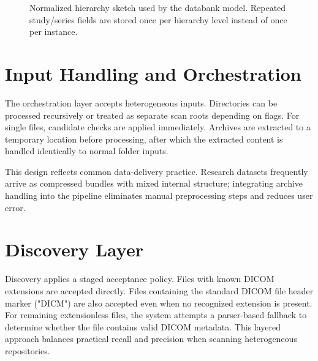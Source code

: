 \begin{figure}[htbp]
\centering
{}
\caption{Normalized hierarchy sketch used by the databank model. Repeated study/series fields are stored once per hierarchy level instead of once per instance.}
\label{fig:normalized-schema-sketch}
\end{figure}

\section{Input Handling and Orchestration}
The orchestration layer accepts heterogeneous inputs. Directories can be processed recursively or treated as separate scan roots depending on flags. For single files, candidate checks are applied immediately. Archives are extracted to a temporary location before processing, after which the extracted content is handled identically to normal folder inputs.

This design reflects common data-delivery practice. Research datasets frequently arrive as compressed bundles with mixed internal structure; integrating archive handling into the pipeline eliminates manual preprocessing steps and reduces user error.

\section{Discovery Layer}
Discovery applies a staged acceptance policy. Files with known DICOM extensions are accepted directly. Files containing the standard DICOM file header marker ("DICM") are also accepted even when no recognized extension is present. For remaining extensionless files, the system attempts a parser-based fallback to determine whether the file contains valid DICOM metadata. This layered approach balances practical recall and precision when scanning heterogeneous repositories.

